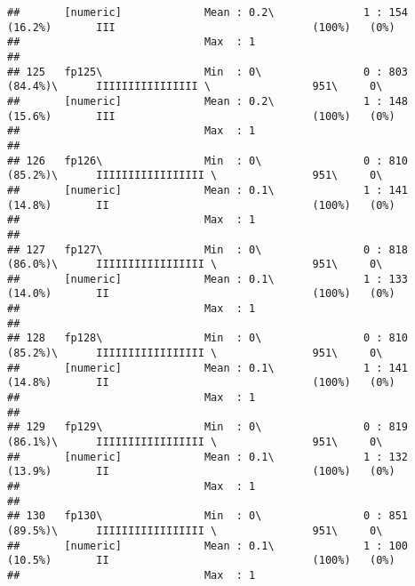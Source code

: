 \documentclass[]{article}
\begin{document}
\begin{verbatim}
##       [numeric]             Mean : 0.2\              1 : 154 (16.2%)       III                               (100%)   (0%)     
##                             Max  : 1                                                                                           
## 
## 125   fp125\                Min  : 0\                0 : 803 (84.4%)\      IIIIIIIIIIIIIIII \                951\     0\       
##       [numeric]             Mean : 0.2\              1 : 148 (15.6%)       III                               (100%)   (0%)     
##                             Max  : 1                                                                                           
## 
## 126   fp126\                Min  : 0\                0 : 810 (85.2%)\      IIIIIIIIIIIIIIIII \               951\     0\       
##       [numeric]             Mean : 0.1\              1 : 141 (14.8%)       II                                (100%)   (0%)     
##                             Max  : 1                                                                                           
## 
## 127   fp127\                Min  : 0\                0 : 818 (86.0%)\      IIIIIIIIIIIIIIIII \               951\     0\       
##       [numeric]             Mean : 0.1\              1 : 133 (14.0%)       II                                (100%)   (0%)     
##                             Max  : 1                                                                                           
## 
## 128   fp128\                Min  : 0\                0 : 810 (85.2%)\      IIIIIIIIIIIIIIIII \               951\     0\       
##       [numeric]             Mean : 0.1\              1 : 141 (14.8%)       II                                (100%)   (0%)     
##                             Max  : 1                                                                                           
## 
## 129   fp129\                Min  : 0\                0 : 819 (86.1%)\      IIIIIIIIIIIIIIIII \               951\     0\       
##       [numeric]             Mean : 0.1\              1 : 132 (13.9%)       II                                (100%)   (0%)     
##                             Max  : 1                                                                                           
## 
## 130   fp130\                Min  : 0\                0 : 851 (89.5%)\      IIIIIIIIIIIIIIIII \               951\     0\       
##       [numeric]             Mean : 0.1\              1 : 100 (10.5%)       II                                (100%)   (0%)     
##                             Max  : 1                                                                                           

\end{verbatim}
\end{document}
